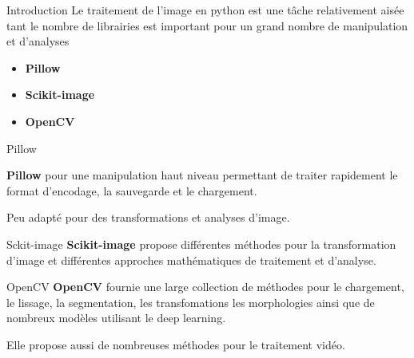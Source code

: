 \begin{frame}{Introduction}
    Le traitement de l'image en python est une tâche relativement aisée tant le nombre de librairies est important pour un grand nombre de manipulation et d'analyses
  
    \begin{itemize}
        \item \alert{\textbf{Pillow}}
        \item \alert{\textbf{Scikit-image}}
        \item \alert{\textbf{OpenCV}}
    \end{itemize}
  \end{frame}

\begin{frame}{Pillow}

    \alert{\textbf{Pillow}} pour une manipulation haut niveau permettant de traiter rapidement le format d'encodage, la sauvegarde et le chargement.

    Peu adapté pour des transformations et analyses d'image.
    
\end{frame}

\begin{frame}{Sckit-image}
    \alert{\textbf{Scikit-image}} propose différentes méthodes pour la transformation d'image et différentes approches mathématiques de traitement et d'analyse.

\end{frame}

\begin{frame}{OpenCV}
    \alert{\textbf{OpenCV}} fournie une large collection de méthodes pour le chargement, le lissage, la segmentation, les transfomations les morphologies ainsi que de nombreux modèles utilisant le deep learning.
    
    Elle propose aussi de nombreuses méthodes pour le traitement vidéo.
    

\end{frame}